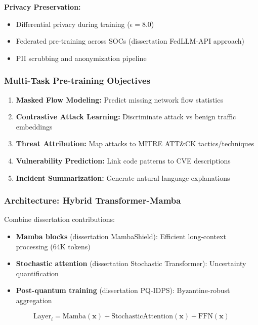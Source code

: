 \documentclass[11pt,letterpaper]{article}
\begin{document}
\textbf{Privacy Preservation:}
\begin{itemize}
\item Differential privacy during training ($\epsilon = 8.0$)
\item Federated pre-training across SOCs (dissertation FedLLM-API approach)
\item PII scrubbing and anonymization pipeline
\end{itemize}

\subsubsection{Multi-Task Pre-training Objectives}

\begin{enumerate}
\item \textbf{Masked Flow Modeling:} Predict missing network flow statistics
\item \textbf{Contrastive Attack Learning:} Discriminate attack vs benign traffic embeddings
\item \textbf{Threat Attribution:} Map attacks to MITRE ATT\&CK tactics/techniques
\item \textbf{Vulnerability Prediction:} Link code patterns to CVE descriptions
\item \textbf{Incident Summarization:} Generate natural language explanations
\end{enumerate}

\subsubsection{Architecture: Hybrid Transformer-Mamba}

Combine dissertation contributions:
\begin{itemize}
\item \textbf{Mamba blocks} (dissertation MambaShield): Efficient long-context processing (64K tokens)
\item \textbf{Stochastic attention} (dissertation Stochastic Transformer): Uncertainty quantification
\item \textbf{Post-quantum training} (dissertation PQ-IDPS): Byzantine-robust aggregation
\end{itemize}

\begin{equation}
\text{Layer}_i = \text{Mamba}(\mathbf{x}) + \text{StochasticAttention}(\mathbf{x}) + \text{FFN}(\mathbf{x})
\end{equation}
\end{document}
